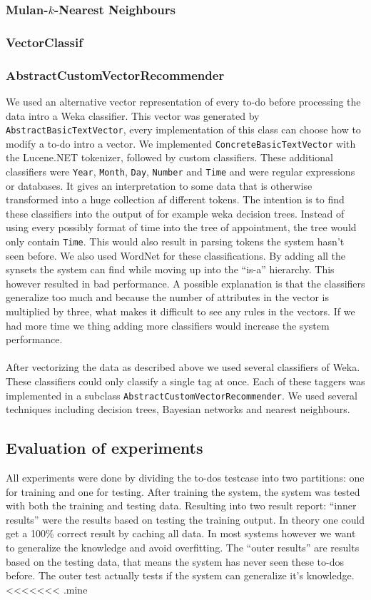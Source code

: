\documentclass[a4paper,titlepage]{article}
\begin{document}
\subsubsection{Mulan-$k$-Nearest Neighbours}
\subsubsection{VectorClassif}
\subsubsection{AbstractCustomVectorRecommender}
We used an alternative vector representation of every to-do before processing the data intro a Weka classifier. This vector was generated by \texttt{AbstractBasicTextVector}, every implementation of this class can choose how to modify a to-do intro a vector. We implemented \texttt{ConcreteBasicTextVector} with the Lucene.NET tokenizer, followed by custom classifiers. These additional classifiers were \texttt{Year}, \texttt{Month}, \texttt{Day}, \texttt{Number} and \texttt{Time} and were regular expressions or databases. It gives an interpretation to some data that is otherwise transformed into a huge collection af different tokens. The intention is to find these classifiers into the output of for example weka decision trees. Instead of using every possibly format of time into the tree of appointment, the tree would only contain \texttt{Time}. This would also result in parsing tokens the system hasn't seen before. We also used WordNet for these classifications. By adding all the synsets the system can find while moving up into the ``is-a'' hierarchy. This however resulted in bad performance. A possible explanation is that the classifiers generalize too much and because the number of attributes in the vector is multiplied by three, what makes it difficult to see any rules in the vectors. If we had more time we thing adding more classifiers would increase the system performance.
\paragraph{}
After vectorizing the data as described above we used several classifiers of Weka. These classifiers could only classify a single tag at once. Each of these taggers was implemented in a subclass \texttt{AbstractCustomVectorRecommender}. We used several techniques including decision trees, Bayesian networks and nearest neighbours.
\subsection{Evaluation of experiments}
All experiments were done by dividing the to-dos testcase into two partitions: one for training and one for testing. After training the system, the system was tested with both the training and testing data. Resulting into two result report: ``inner results'' were the results based on testing the training output. In theory one could get a 100\% correct result by caching all data. In most systems however we want to generalize the knowledge and avoid overfitting. The ``outer results'' are results based on the testing data, that means the system has never seen these to-dos before. The outer test actually tests if the system can generalize it's knowledge.
<<<<<<< .mine
\end{document}
